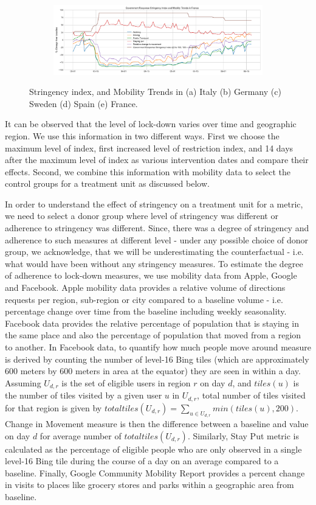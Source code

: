 \documentclass[final,authoryear,5p,times,twocolumn]{elsarticle}
\begin{document}
\begin{figure}
	\begin{subfigure}[b]{\textwidth}
		\centering
		\includegraphics[width=0.84\linewidth,height=0.18\textheight]{FIG6}
	\end{subfigure}
	
	\caption[Mobility Trends]{Stringency index, and Mobility Trends in (a) Italy (b) Germany (c) Sweden (d) Spain (e) France.}
	\label{fig2} 
\end{figure}

    It can be observed that the level of lock-down varies over time and geographic region. We use this information in two different ways. First we choose the maximum level of index, first increased level of restriction index, and 14 days after the maximum level of index as various intervention dates and compare their effects. Second, we combine this information with mobility data to select the control groups for a treatment unit as discussed below.
    
    In order to understand the effect of stringency on a treatment unit for a metric, we need to select a donor group where level of stringency was different or adherence to stringency was different. Since, there was a degree of stringency and adherence to such measures at different level - under any possible choice of donor group, we acknowledge, that we will be underestimating the counterfactual - i.e. what would have been without any stringency measures. To estimate the degree of adherence to lock-down measures, we use mobility data from Apple, Google and Facebook. Apple mobility data provides a relative volume of directions requests per region, sub-region or city compared to a baseline volume - i.e. percentage change over time from the baseline including weekly seasonality. Facebook data provides the relative percentage of population that is staying in the same place and also the percentage of population that moved from a region to another.  In Facebook data, to quantify how much people move around measure is derived by counting the number of level-16 Bing tiles (which are approximately 600 meters by 600 meters in area at the equator) they are seen in within a day. Assuming $U_{d,r}$ is the set of eligible users in region $r$ on day $d$, and $tiles(u)$ is the number of tiles visited by a given user $u$ in $U_{d,r}$, total number of tiles visited for that region is given by $totaltiles(U_{d,r}) = \sum_{u \in U_{d,r}} min(tiles(u), 200)$. Change in Movement measure is then the difference between a baseline and value on day $d$ for average number of $totaltiles(U_{d,r})$. Similarly, Stay Put metric is calculated as the percentage of eligible people who are only observed in a single level-16 Bing tile during the course of a day on an average compared to a baseline. Finally, Google Community Mobility Report provides a percent change in visits to places like grocery stores and parks within a geographic area from baseline.
    
\end{document}
